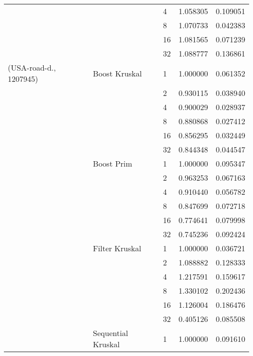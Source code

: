 \begin{tabular}{lllrr}
                       &                    & 4  &  1.058305 &  0.109051 \\
                       &                    & 8  &  1.070733 &  0.042383 \\
                       &                    & 16 &  1.081565 &  0.071239 \\
                       &                    & 32 &  1.088777 &  0.136861 \\
(USA-road-d., 1207945) & Boost Kruskal & 1  &  1.000000 &  0.061352 \\
                       &                    & 2  &  0.930115 &  0.038940 \\
                       &                    & 4  &  0.900029 &  0.028937 \\
                       &                    & 8  &  0.880868 &  0.027412 \\
                       &                    & 16 &  0.856295 &  0.032449 \\
                       &                    & 32 &  0.844348 &  0.044547 \\
                       & Boost Prim & 1  &  1.000000 &  0.095347 \\
                       &                    & 2  &  0.963253 &  0.067163 \\
                       &                    & 4  &  0.910440 &  0.056782 \\
                       &                    & 8  &  0.847699 &  0.072718 \\
                       &                    & 16 &  0.774641 &  0.079998 \\
                       &                    & 32 &  0.745236 &  0.092424 \\
                       & Filter Kruskal & 1  &  1.000000 &  0.036721 \\
                       &                    & 2  &  1.088882 &  0.128333 \\
                       &                    & 4  &  1.217591 &  0.159617 \\
                       &                    & 8  &  1.330102 &  0.202436 \\
                       &                    & 16 &  1.126004 &  0.186476 \\
                       &                    & 32 &  0.405126 &  0.085508 \\
                       & Sequential Kruskal & 1  &  1.000000 &  0.091610 \\

\end{tabular}
